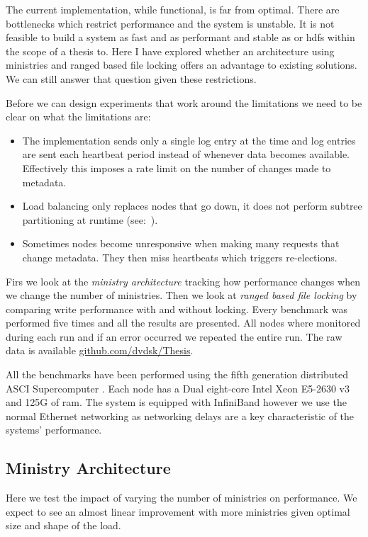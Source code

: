 The current implementation, while functional, is far from optimal. There are bottlenecks which restrict performance and the system is unstable. It is not feasible to build a system as fast and as performant and stable as \ceph{} or \ac{hdfs} within the scope of a thesis to. Here I have explored whether an architecture using ministries and ranged based file locking offers an advantage to existing solutions. We can still answer that question given these restrictions.

Before we can design experiments that work around the limitations we need to be clear on what the limitations are:

\begin{itemize}
	\item The \raft{} implementation sends only a single log entry at the time and log entries are sent each heartbeat period instead of whenever data becomes available. Effectively this imposes a rate limit on the number of changes made to metadata.
	\item Load balancing only replaces nodes that go down, it does not perform subtree partitioning at runtime (see:~).
	\item Sometimes nodes become unresponsive when making many requests that change metadata. They then miss heartbeats which triggers re-elections.
\end{itemize}

Firs we look at the \textit{ministry architecture} tracking how performance changes when we change the number of ministries. Then we look at \textit{ranged based file locking} by comparing write performance with and without locking. Every benchmark was performed five times and all the results are presented. All nodes where monitored during each run and if an error occurred we repeated the entire run. The raw data is available \href{https://github.com/dvdsk/Thesis}{github.com/dvdsk/Thesis}.

All the benchmarks have been performed using the fifth generation distributed ASCI Supercomputer \cite{das5}. Each node has a Dual eight-core Intel Xeon E5-2630 v3 and 125G of ram. The system is equipped with InfiniBand however we use the normal Ethernet networking as networking delays are a key characteristic of the systems' performance.

\subsection{Ministry Architecture}
Here we test the impact of varying the number of ministries on performance. We expect to see an almost linear improvement with more ministries given optimal size and shape of the load.

